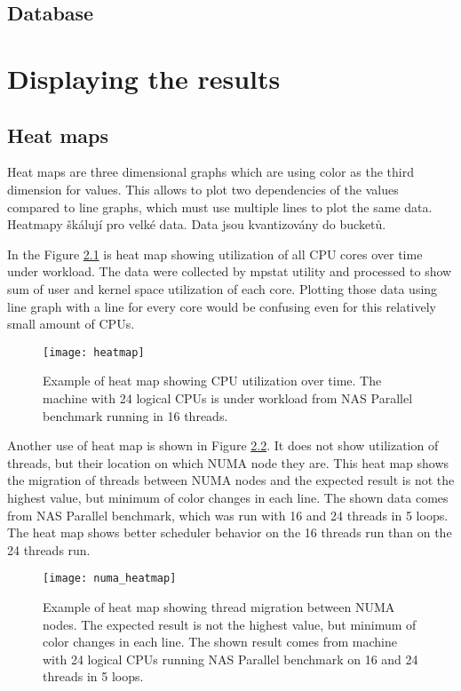 \section{Database}


\chapter{Displaying the results}
\section{Heat maps}
Heat maps are three dimensional graphs which are using color as the third
dimension for values. This allows to plot two dependencies of the values
compared to line graphs, which must use multiple lines to plot the same data.
Heatmapy škálují pro velké data. 
Data jsou kvantizovány do bucketů.

In the Figure \ref{fig:heatmap} is heat map showing utilization of all CPU cores over
time under workload. The data were collected by mpstat utility and processed to
show sum of user and kernel space utilization of each core. Plotting those data
using line graph with a line for every core would be confusing even for this
relatively small amount of CPUs.

\begin{figure}
  \centering
  \texttt{[image: heatmap]}
  \caption{Example of heat map showing CPU utilization over time. The machine
    with 24 logical CPUs is under workload from NAS Parallel benchmark running
    in 16 threads.}
  \label{fig:heatmap}
\end{figure}

Another use of heat map is shown in Figure \ref{fig:numa_heatmap}. It does not
show utilization of threads, but their location on which NUMA node they are.
This heat map shows the migration of threads between NUMA nodes and the expected
result is not the highest value, but minimum of color changes in each line. The
shown data comes from NAS Parallel benchmark, which was run with 16 and 24
threads in 5 loops. The heat map shows better scheduler behavior on the 16
threads run than on the 24 threads run.

\begin{figure}
  \centering
  \texttt{[image: numa\_heatmap]}
  \caption{Example of heat map showing thread migration between NUMA nodes. The
    expected result is not the highest value, but minimum of color changes in
    each line. The shown result comes from machine with 24 logical CPUs running
    NAS Parallel benchmark on 16 and 24 threads in 5 loops.}
  \label{fig:numa_heatmap}
\end{figure}

